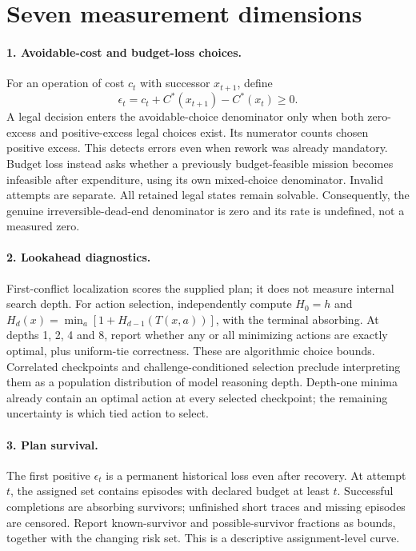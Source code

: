 \documentclass[10pt,twocolumn]{article}
\begin{document}
\section{Seven measurement dimensions}
\label{sec:metrics}
\paragraph{1. Avoidable-cost and budget-loss choices.}
For an operation of cost $c_t$ with successor $x_{t+1}$, define
\[
\epsilon_t=c_t+C^*(x_{t+1})-C^*(x_t)\geq0.
\]
A legal decision enters the avoidable-choice denominator only when both
zero-excess and positive-excess legal choices exist. Its numerator counts
chosen positive excess. This detects errors even when rework was already
mandatory. Budget loss instead asks whether a previously budget-feasible
mission becomes infeasible after expenditure, using its own mixed-choice
denominator. Invalid attempts are separate.
All retained legal states remain solvable. Consequently, the genuine
irreversible-dead-end denominator is zero and its rate is undefined,
not a measured zero.

\paragraph{2. Lookahead diagnostics.}
First-conflict localization scores the supplied plan; it does not measure
internal search depth. For action selection, independently compute
$H_0=h$ and
$H_d(x)=\min_a[1+H_{d-1}(T(x,a))]$, with the terminal absorbing.
At depths 1, 2, 4 and 8, report whether any or all minimizing actions
are exactly optimal, plus uniform-tie correctness.
These are algorithmic choice bounds. Correlated checkpoints and
challenge-conditioned selection preclude interpreting them as a population
distribution of model reasoning depth.
Depth-one minima already contain an optimal action at every selected
checkpoint; the remaining uncertainty is which tied action to select.

\paragraph{3. Plan survival.}
The first positive $\epsilon_t$ is a permanent historical loss even after
recovery. At attempt $t$, the assigned set contains episodes with declared
budget at least $t$. Successful completions are absorbing survivors;
unfinished short traces and missing episodes are censored.
Report known-survivor and possible-survivor fractions as bounds, together
with the changing risk set. This is a descriptive assignment-level curve.
\end{document}
